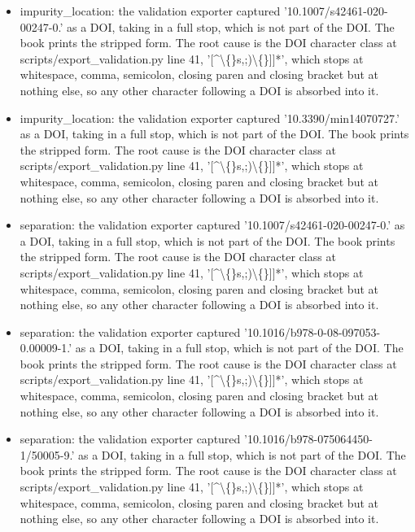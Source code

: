 \documentclass[10pt,a4paper,twoside]{report}
\begin{document}
\begin{itemize}
\item impurity\_location: the validation exporter captured '10.1007/s42461-020-00247-0.' as a DOI, taking in a full stop, which is not part of the DOI. The book prints the stripped form. The root cause is the DOI character class at scripts/export\_validation.py line 41, '[\textasciicircum{}\textbackslash\{\}s,;)\textbackslash\{\}]]*', which stops at whitespace, comma, semicolon, closing paren and closing bracket but at nothing else, so any other character following a DOI is absorbed into it.

\item impurity\_location: the validation exporter captured '10.3390/min14070727.' as a DOI, taking in a full stop, which is not part of the DOI. The book prints the stripped form. The root cause is the DOI character class at scripts/export\_validation.py line 41, '[\textasciicircum{}\textbackslash\{\}s,;)\textbackslash\{\}]]*', which stops at whitespace, comma, semicolon, closing paren and closing bracket but at nothing else, so any other character following a DOI is absorbed into it.

\item separation: the validation exporter captured '10.1007/s42461-020-00247-0.' as a DOI, taking in a full stop, which is not part of the DOI. The book prints the stripped form. The root cause is the DOI character class at scripts/export\_validation.py line 41, '[\textasciicircum{}\textbackslash\{\}s,;)\textbackslash\{\}]]*', which stops at whitespace, comma, semicolon, closing paren and closing bracket but at nothing else, so any other character following a DOI is absorbed into it.

\item separation: the validation exporter captured '10.1016/b978-0-08-097053-0.00009-1.' as a DOI, taking in a full stop, which is not part of the DOI. The book prints the stripped form. The root cause is the DOI character class at scripts/export\_validation.py line 41, '[\textasciicircum{}\textbackslash\{\}s,;)\textbackslash\{\}]]*', which stops at whitespace, comma, semicolon, closing paren and closing bracket but at nothing else, so any other character following a DOI is absorbed into it.

\item separation: the validation exporter captured '10.1016/b978-075064450-1/50005-9.' as a DOI, taking in a full stop, which is not part of the DOI. The book prints the stripped form. The root cause is the DOI character class at scripts/export\_validation.py line 41, '[\textasciicircum{}\textbackslash\{\}s,;)\textbackslash\{\}]]*', which stops at whitespace, comma, semicolon, closing paren and closing bracket but at nothing else, so any other character following a DOI is absorbed into it.


\end{itemize}
\end{document}
